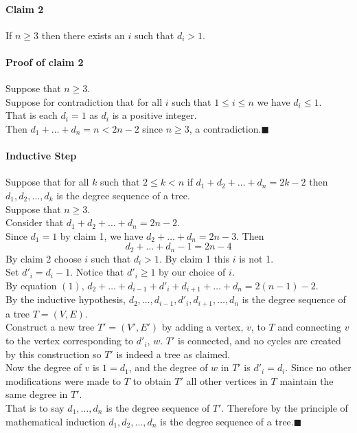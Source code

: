 \documentclass[letterpaper,12pt,oneside,onecolumn]{report}
\begin{document}
\paragraph{Claim 2}
If $n \geq 3$ then there exists an $i$ such that $d_i > 1$.
\paragraph{Proof of claim 2}
Suppose that $n \geq 3$.\\
Suppose for contradiction that for all $i$ such that $1 \leq i \leq n$ we have $d_i \leq 1$.\\
That is each $d_i = 1$ as $d_i$ is a positive integer.\\
Then $d_1 + \ldots + d_n = n < 2n-2$ since $n \geq 3$, a contradiction.$\blacksquare$
\paragraph{Inductive Step}
Suppose that for all $k$ such that $2 \leq k < n$  if $d_1 + d_2 + \ldots + d_n = 2k - 2$ then $d_1,d_2,\ldots,d_k$ is the degree sequence of a tree.\\
Suppose that $n \geq 3$.\\
Consider that $d_1 + d_2 + \ldots + d_n = 2n-2$.\\
Since $d_1 = 1$ by claim 1, we have $d_2 + \ldots + d_n = 2n-3$. Then\
\begin{equation}
d_2 + \ldots + d_n - 1 = 2n-4
\end{equation} 
By claim 2 choose $i$ such that $d_i > 1$. By claim 1 this $i$ is not 1.\\
Set $d'_i = d_i -1$. Notice that $d'_i \geq 1$ by our choice of $i$.\\
By equation $(1)$, $d_2 + \ldots + d_{i-1} + d'_i + d_{i+1} + \ldots + d_n = 2(n-1) - 2$.\\
By the inductive hypothesis, $d_2,\ldots,d_{i-1},d'_i,d_{i+1},\ldots,d_n$ is the degree sequence of a tree $T=(V,E)$.\\
Construct a new tree $T'=(V',E')$ by adding a vertex, $v$, to $T$ and connecting $v$ to the vertex corresponding to $d'_{i}$, $w$. $T'$ is connected, and no cycles are created by this construction so $T'$ is indeed a tree as claimed.\\
Now the degree of $v$ is $1=d_1$, and the degree of $w$ in $T'$ is $d'_{i} = d_i$. Since no other modifications were made to $T$ to obtain $T'$ all other vertices in $T$ maintain the same degree in $T'$.\\
That is to say $d_1,\ldots,d_n$ is the degree sequence of $T'$.
Therefore by the principle of mathematical induction $d_1, d_2, \ldots, d_n$ is the degree sequence of a tree.$\blacksquare$
\end{document}
